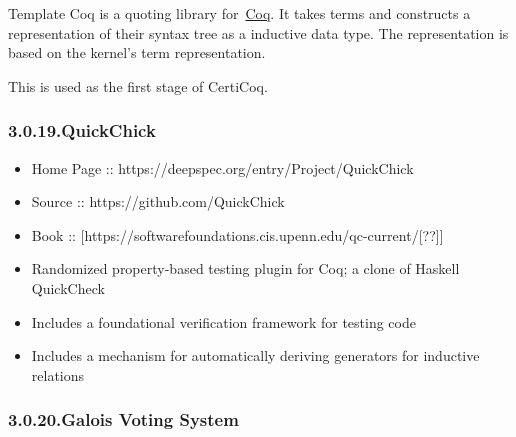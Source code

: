 \documentclass[12pt,twoside]{article}
\begin{document}
\noindent{}Template Coq is a quoting library for~\href{http://coq.inria.fr}{Coq}. It
takes  terms and constructs a representation of their syntax tree as
a  inductive data type. The representation is based on the kernel's
term representation.%

This is used as the first stage of CertiCoq.%

\subsubsection{3.0.19.\hspace*{0.5em}QuickChick}\label{sec-quickchick}%

\begin{itemize}%

\item{}
Home Page :: https://deepspec.org/entry/Project/QuickChick%

\item{}
Source :: https://github.com/QuickChick%

\item{}
Book :: [https://softwarefoundations.cis.upenn.edu/qc-current/[??]]%

\item{}
Randomized property-based testing plugin for Coq; a clone of Haskell QuickCheck%

\item{}
Includes a foundational verification framework for testing code%

\item{}
Includes a mechanism for automatically deriving generators for inductive relations%
\end{itemize}%

\subsubsection{3.0.20.\hspace*{0.5em}Galois Voting System}\label{sec-galois-voting-system}%
\end{document}
